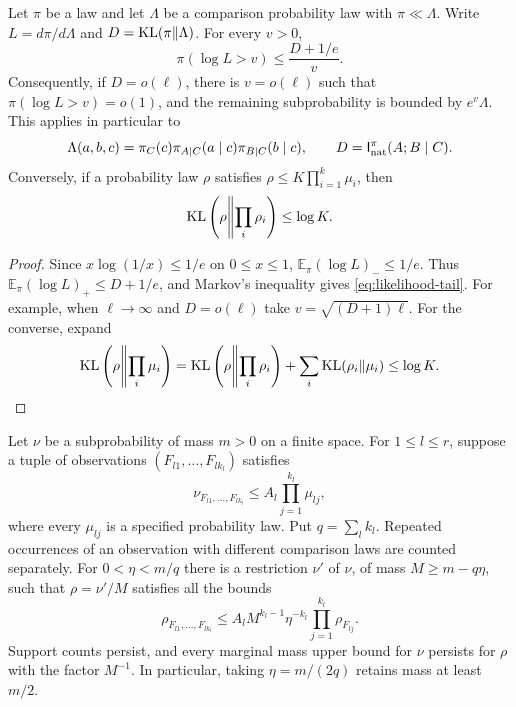 \begin{lemma}
\label{lem:zero-information}
Let $\pi$ be a law and let $\Lambda$ be a comparison probability law
with $\pi\ll\Lambda$.  Write $L=d\pi/d\Lambda$ and
$D=\operatorname{KL}(\pi\Vert\Lambda)$.  For every $v>0$,
\begin{equation}
 \pi(\log L>v)\le\frac{D+1/e}{v}.
 \label{eq:likelihood-tail}
\end{equation}
Consequently, if $D=o(\ell)$, there is $v=o(\ell)$ such that
$\pi(\log L>v)=o(1)$, and the remaining subprobability is bounded
by $e^v\Lambda$.  This applies in particular to
\[
 \Lambda(a,b,c)=\pi_C(c)\pi_{A\mid C}(a\mid c)
                            \pi_{B\mid C}(b\mid c),
 \qquad D=\mathsf I_{\mathrm{nat}}^\pi(A;B\mid C).
\]
Conversely, if a probability law $\rho$ satisfies
$\rho\le K\prod_{i=1}^k\mu_i$, then
\begin{equation}
 \operatorname{KL}\left(\rho\middle\Vert\prod_i\rho_i\right)\le\log K.
 \label{eq:product-information}
\end{equation}
\end{lemma}

\begin{proof}
Since $x\log(1/x)\le1/e$ on $0\le x\le1$,
$\mathbb E_\pi(\log L)_-\le1/e$.
Thus $\mathbb E_\pi(\log L)_+\le D+1/e$, and Markov's inequality
gives \eqref{eq:likelihood-tail}.  For example, when $\ell\to\infty$
and $D=o(\ell)$ take $v=\sqrt{(D+1)\ell}$.
For the converse, expand
\[
 \operatorname{KL}\left(\rho\middle\Vert\prod_i\mu_i\right)
 =\operatorname{KL}\left(\rho\middle\Vert\prod_i\rho_i\right)
       +\sum_i\operatorname{KL}(\rho_i\Vert\mu_i)\le\log K.\qedhere
\]
\end{proof}

\begin{lemma}
\label{lem:marginal-core}
Let $\nu$ be a subprobability of mass $m>0$ on a finite space.
For $1\le l\le r$, suppose a tuple of observations
$(F_{l1},\ldots,F_{lk_l})$ satisfies
\begin{equation}
 \nu_{F_{l1},\ldots,F_{lk_l}}
       \le A_l\prod_{j=1}^{k_l}\mu_{lj},
 \label{eq:core-comparison}
\end{equation}
where every $\mu_{lj}$ is a specified probability law.
Put $q=\sum_l k_l$.  Repeated occurrences of an observation with
different comparison laws are counted separately.  For
$0<\eta<m/q$ there is a restriction $\nu'$ of $\nu$, of mass
$M\ge m-q\eta$, such that $\rho=\nu'/M$ satisfies all the bounds
\begin{equation}
 \rho_{F_{l1},\ldots,F_{lk_l}}
 \le A_l M^{k_l-1}\eta^{-k_l}
           \prod_{j=1}^{k_l}\rho_{F_{lj}}.
 \label{eq:core-actual}
\end{equation}
Support counts persist, and every marginal mass upper bound for
$\nu$ persists for $\rho$ with the factor $M^{-1}$.
In particular, taking $\eta=m/(2q)$ retains mass at least $m/2$.
\end{lemma}

